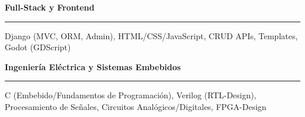 \documentclass[11pt, a4paper, sans]{moderncv}
\begin{document}
        \noindent\textbf{Full-Stack y Frontend}
        \nopagebreak[4]
        \hspace{0pt}\rule{\linewidth}{0.2pt}
        \nopagebreak[4]
        Django (MVC, ORM, Admin), HTML/CSS/JavaScript, CRUD APIs, Templates, Godot (GDScript)
        \vspace{8pt}

        \noindent\textbf{Ingeniería Eléctrica y Sistemas Embebidos}
        \nopagebreak[4]
        \hspace{0pt}\rule{\linewidth}{0.2pt}
        \nopagebreak[4]
        C (Embebido/Fundamentos de Programación), Verilog (RTL-Design), Procesamiento de Señales, Circuitos Analógicos/Digitales, FPGA-Design

\end{document}
